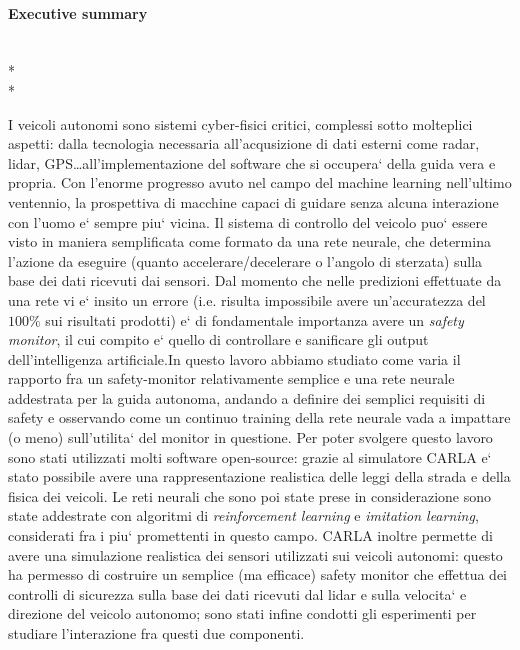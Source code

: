 \paragraph{Executive summary}\mbox{}\\*\\*

I veicoli autonomi sono sistemi cyber-fisici critici, complessi sotto molteplici aspetti: dalla tecnologia necessaria all'acqusizione di dati esterni come radar, lidar, GPS\dots all'implementazione del software che si occupera` della guida vera e propria. Con l'enorme progresso avuto nel campo del machine learning nell'ultimo ventennio, la prospettiva di macchine capaci di guidare senza alcuna interazione con l'uomo e` sempre piu` vicina.\newline
Il sistema di controllo del veicolo puo` essere visto in maniera semplificata come formato da una rete neurale, che determina l'azione da eseguire (quanto accelerare/decelerare o l'angolo di sterzata) sulla base dei dati ricevuti dai sensori. Dal momento che nelle predizioni effettuate da una rete vi e` insito un errore (i.e. risulta impossibile avere un'accuratezza del $100\%$ sui risultati prodotti) e` di fondamentale importanza avere un \textsl{safety monitor}, il cui compito e` quello di controllare e sanificare gli output dell'intelligenza artificiale.\newline In questo lavoro abbiamo studiato come varia il rapporto fra un safety-monitor relativamente semplice e una rete neurale addestrata per la guida autonoma, andando a definire dei semplici requisiti di safety e osservando come un continuo training della rete neurale vada a impattare (o meno) sull'utilita` del monitor in questione.\newline
Per poter svolgere questo lavoro sono stati utilizzati molti software open-source: grazie al simulatore CARLA e` stato possibile avere una rappresentazione realistica delle leggi della strada e della fisica dei veicoli. Le reti neurali che sono poi state prese in considerazione sono state addestrate con algoritmi di \textsl{reinforcement learning} e \textsl{imitation learning}, considerati fra i piu` promettenti in questo campo. CARLA inoltre permette di avere una simulazione realistica dei sensori utilizzati sui veicoli autonomi: questo ha permesso di costruire un semplice (ma efficace) safety monitor che effettua dei controlli di sicurezza sulla base dei dati ricevuti dal lidar e sulla velocita` e direzione del veicolo autonomo; sono stati infine condotti gli esperimenti per studiare l'interazione fra questi due componenti.

